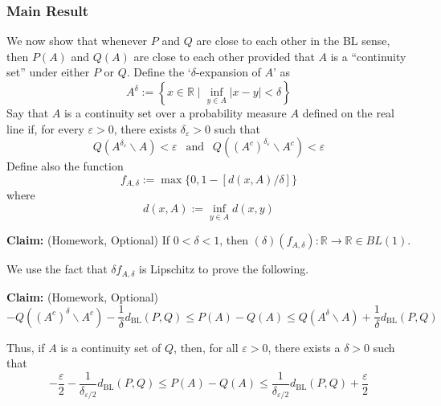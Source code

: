 \documentclass[11pt]{article} %
\begin{document}
\subsubsection{Main Result}

We now show that whenever $P$ and $Q$ are close to each other in the BL sense, then $P(A)$ and $Q(A)$ are close to each other provided that $A$ is a ``continuity set'' under either $P$ or $Q$. Define the `$\delta$-expansion of $A$' as
\begin{equation}
	A^\delta := \left\{ x \in \mathbb{R} \mid \inf_{y \in A} | x - y | < \delta \right\}
\end{equation}
Say that $A$ is a continuity set over a probability measure $A$ defined on the real line if, for every $\varepsilon > 0$, there exists $\delta_\varepsilon > 0$ such that
\begin{equation}
	Q ( A^{\delta_\varepsilon} \backslash A ) < \varepsilon \ \ \text{ and } \ \ Q ( (A^c)^{\delta_\varepsilon} \backslash A^c ) < \varepsilon 
\end{equation}
Define also the function 
\begin{equation}
	f_{A, \delta} := \max\{ 0, 1 - [d(x,A)/\delta] \} 
\end{equation}
where
\begin{equation}
	d(x,A) := \inf_{y \in A} d(x,y)
\end{equation}

\noindent \textbf{Claim:} (Homework, Optional) If $0 < \delta < 1$, then $(\delta) (f_{A,\delta}) : \mathbb{R} \to \mathbb{R} \in BL(1)$.

We use the fact that $\delta f_{A,\delta}$ is Lipschitz to prove the following.

\noindent \textbf{Claim:} (Homework, Optional) 
\begin{equation}
	- Q ( (A^c)^{\delta} \backslash A^c ) - \frac{1}{\delta} d_{\text{BL}} (P,Q) \leq P(A) - Q(A) \leq Q ( A^{\delta} \backslash A ) + \frac{1}{\delta} d_{\text{BL}} (P,Q)
\end{equation}

Thus, if $A$ is a continuity set of $Q$, then, for all $\varepsilon > 0$, there exists a $\delta > 0$ such that
\begin{equation}
	- \frac{\varepsilon}{2} - \frac{1}{\delta_{\varepsilon/2}} d_{\text{BL}} (P,Q) \leq P(A) - Q(A) \leq \frac{1}{\delta_{\varepsilon/2}} d_{\text{BL}} (P,Q)  + \frac{\varepsilon}{2}
\end{equation}


\newpage
\end{document}

